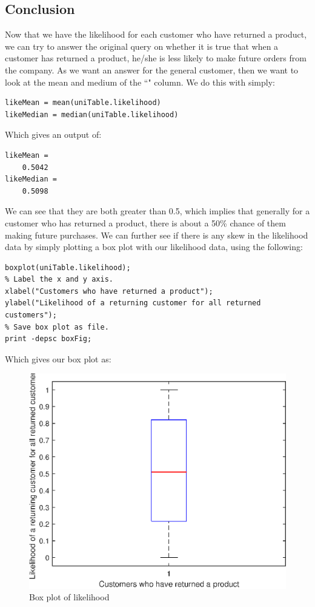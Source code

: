 \documentclass[12pt]{article}
\newcommand{\hl}[1]{``\path{#1}"}
\begin{document}
\subsection{Conclusion}
Now that we have the likelihood for each customer who have returned a product, we can try to answer the original query on whether it is true that when a customer has returned a product, he/she is less likely to make future orders from the company. As we want an answer for the general customer, then we want to look at the mean and medium of the \hl{likelihood} column. We do this with simply:
\begin{lstlisting}[title={Finding the mean and medium likelihood}]
% Find the mean and median of the likelihood column in table uniTable.
likeMean = mean(uniTable.likelihood)
likeMedian = median(uniTable.likelihood)
\end{lstlisting}
Which gives an output of:
\begin{lstlisting}[title={Mean and medium likelihood}]
likeMean =
    0.5042
likeMedian =
    0.5098
\end{lstlisting}
We can see that they are both greater than 0.5, which implies that generally for a customer who has returned a product, there is about a 50\% chance of them making future purchases. We can further see if there is any skew in the likelihood data by simply plotting a box plot with our likelihood data, using the following:
\begin{lstlisting}[title={Plotting the box plot}]
% Draw boxplot using likelihood column data from uniTable.
boxplot(uniTable.likelihood);
% Label the x and y axis.
xlabel("Customers who have returned a product");
ylabel("Likelihood of a returning customer for all returned customers");
% Save box plot as file.
print -depsc boxFig;
\end{lstlisting}
Which gives our box plot as:
\begin{figure}[H]
    \centering
    \includegraphics{boxFig}
    \caption{Box plot of likelihood}
\end{figure}
\end{document}

